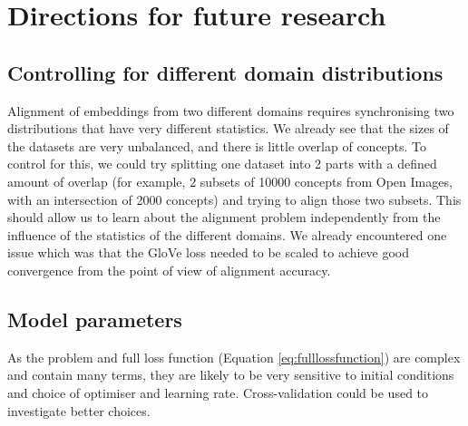 


\section{Directions for future research}

\subsection{Controlling for different domain distributions}
Alignment of embeddings from two different domains requires synchronising two distributions that have very different statistics. We already see that the sizes of the datasets are very unbalanced, and there is little overlap of concepts. To control for this, we could try splitting one dataset into 2 parts with a defined amount of overlap (for example, 2 subsets of 10000 concepts from Open Images, with an intersection of 2000 concepts) and trying to align those two subsets. This should allow us to learn about the alignment problem independently from the influence of the statistics of the different domains. We already encountered one issue which was that the GloVe loss needed to be scaled to achieve good convergence from the point of view of alignment accuracy. 

\subsection{Model parameters}

As the problem and full loss function (Equation \ref{eq:fulllossfunction}) are complex and contain many terms, they are likely to be very sensitive to initial conditions and choice of optimiser and learning rate. Cross-validation could be used to investigate better choices. 

